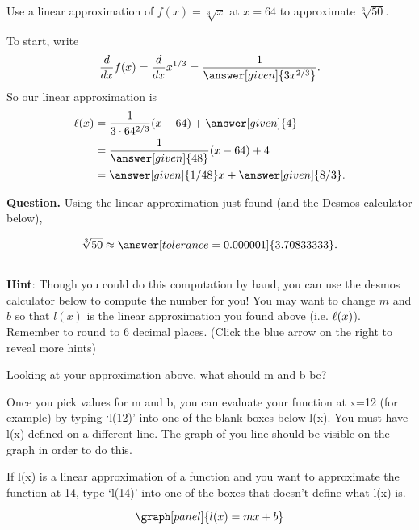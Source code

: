 \documentclass[handout,nooutcomes]{ximera}
\begin{document}
\begin{example}
Use a linear approximation of $f(x) =\sqrt[3]{x}$ at $x=64$ to
approximate $\sqrt[3]{50}$.\\

\begin{explanation}
To start, write
\[
\ddx f(x) = \ddx x^{1/3} = \frac{1}{\answer[given]{3x^{2/3}}}.
\]
So our linear approximation is
\begin{align*}
\l(x) &= \frac{1}{3\cdot 64^{2/3}} (x-64) + \answer[given]{4} \\
&= \frac{1}{\answer[given]{48}} (x-64) + 4\\
&= \answer[given]{1/48}x + \answer[given]{8/3}.
\end{align*}



\textbf{Question. } Using the linear approximation just found (and
the Desmos calculator below),

\[
\sqrt[3]{50} \approx \answer[tolerance=0.000001]{3.70833333}.\\
\]

$\phantom{.}$\\
\bigskip

\textbf{Hint}: Though you could do this computation by hand, you can use
the desmos calculator below to compute the number for you! You may want
to change $m$ and $b$ so that $l(x)$ is the linear approximation you
found above (i.e. $\ell(x)$). Remember to round to 6 decimal places.
(Click the blue arrow on the right to reveal more hints)

\begin{expandable}
Looking at your approximation above, what should m and b be?
\begin{expandable}
Once you pick values for m and b, you can evaluate your function
at x=12 (for example) by typing `l(12)' into one of the blank boxes below l(x).
You must have l(x) defined on a different line. The graph of you line
should be visible on the graph in order to do this.
\begin{expandable}
If l(x) is a linear approximation of a function and you want to approximate
the function at 14, type `l(14)' into one of the boxes that doesn't define what l(x) is.
\end{expandable}
\end{expandable}
\end{expandable}

\[
\graph[panel]{l(x)=mx+b}
\]
$\phantom{.}$\\
\bigskip


\end{explanation}
\end{example}
\end{document}
